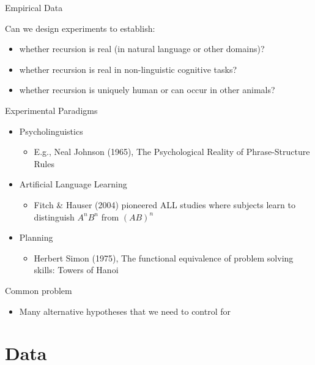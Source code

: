 \documentclass[xcolor=table,handout]{beamer}
\begin{document}
\begin{frame}{Empirical Data}

Can we design experiments to establish:
\begin{itemize}
\item whether recursion is real (in natural language or other domains)?
\item whether recursion is real in non-linguistic cognitive tasks?
\item whether recursion is uniquely human or can occur in other animals?
\end{itemize}
\end{frame}

\begin{frame}{Experimental Paradigms}
  \begin{itemize}
  \item Psycholinguistics
    \begin{itemize}
    \item E.g., Neal Johnson (1965), The Psychological Reality of
      Phrase-Structure Rules
    \end{itemize}
  \item Artificial Language Learning
    \begin{itemize}
    \item Fitch \& Hauser (2004) pioneered ALL studies where subjects
       learn to distinguish $A^nB^n$ from $(AB)^n$
    \end{itemize}
  \item Planning
    \begin{itemize}
    \item Herbert Simon (1975), The functional equivalence of problem
      solving skills: Towers of Hanoi
    \end{itemize}
  \end{itemize}
\end{frame}

\begin{frame}{Common problem}
  \begin{itemize}
  \item Many alternative hypotheses that we need to control for
  \end{itemize}
\end{frame}

\section{Data}
\label{sec:data}
\end{document}
